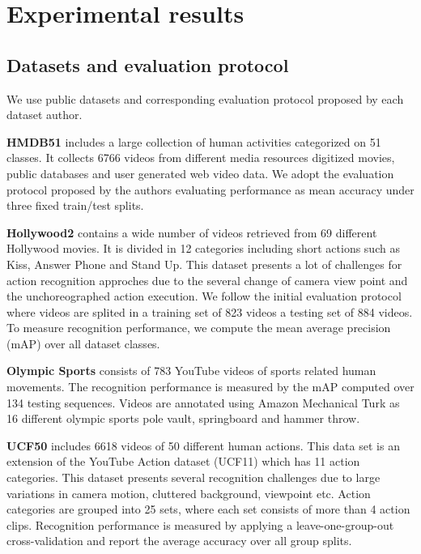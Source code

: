 \section{Experimental results}
\label{results}
\subsection{Datasets and evaluation protocol}
\label{subsec:datasets}
We use public datasets and corresponding evaluation protocol proposed by each dataset author. 

\textbf{HMDB51} \cite{kuehne2011} includes a large collection of human activities categorized on 51 classes. It collects 6766 videos from different media resources \ie digitized movies, public databases and user generated web video data. We adopt the evaluation protocol proposed by the authors evaluating performance as mean accuracy under three fixed train/test splits.

\textbf{Hollywood2} \cite{marszalek2009} contains a wide number of videos retrieved from 69 different Hollywood movies. It is divided in 12 categories including short actions such as Kiss, Answer Phone and Stand Up. This dataset presents a lot of challenges for action recognition approches due to the several change of camera view point and the unchoreographed action execution. We follow the initial evaluation protocol where videos are splited in a training set of 823 videos a testing set of 884 videos. To measure recognition performance, we compute the mean average precision (mAP) over all dataset 
classes.

\textbf{Olympic Sports} \cite{niebles2010} consists of 783 YouTube videos of sports related human movements. The recognition performance is measured 
by the mAP computed over 134 testing sequences. Videos are annotated using Amazon Mechanical Turk as 16 different olympic sports \eg pole vault, springboard and hammer throw.

\textbf{UCF50} \cite{reddy2013} includes 6618 videos of 50 different human actions. This data set is an extension of the YouTube Action dataset (UCF11) which has 11 action categories. This dataset presents several recognition challenges due to large variations in camera motion, cluttered background, viewpoint etc. Action categories are grouped into 25 sets, where each set consists of more than 4 action clips. Recognition performance is measured by applying a leave-one-group-out cross-validation and report the average accuracy over all group splits. 

